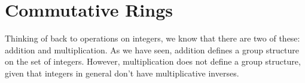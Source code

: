



\section{Commutative Rings}\label{sec:rings}
Thinking of back to operations on integers, we know that there are two of these: addition and multiplication. As we have seen, addition defines a group structure on the set of integers. However, multiplication does not define a group structure, given that integers in general don't have multiplicative inverses.

